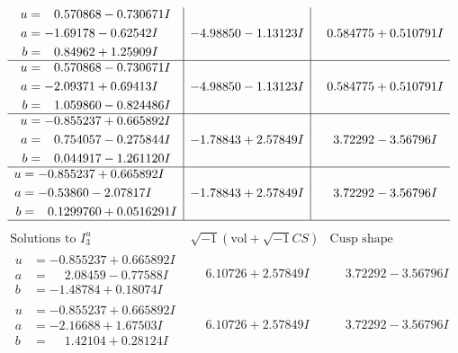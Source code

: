 \documentclass[1p]{elsarticle_modified}
\theoremstyle{definition}
\newcommand{\I}{\sqrt{-1}}
\begin{document}
$$\begin{array}{c|c|c}
\begin{aligned}
u &= \phantom{-}0.570868 - 0.730671 I \\
a &= -1.69178 - 0.62542 I \\
b &= \phantom{-}0.84962 + 1.25909 I\end{aligned}
 & -4.98850 - 1.13123 I & \phantom{-}0.584775 + 0.510791 I \\ \hline\begin{aligned}
u &= \phantom{-}0.570868 - 0.730671 I \\
a &= -2.09371 + 0.69413 I \\
b &= \phantom{-}1.059860 - 0.824486 I\end{aligned}
 & -4.98850 - 1.13123 I & \phantom{-}0.584775 + 0.510791 I \\ \hline\begin{aligned}
u &= -0.855237 + 0.665892 I \\
a &= \phantom{-}0.754057 - 0.275844 I \\
b &= \phantom{-}0.044917 - 1.261120 I\end{aligned}
 & -1.78843 + 2.57849 I & \phantom{-}3.72292 - 3.56796 I \\ \hline\begin{aligned}
u &= -0.855237 + 0.665892 I \\
a &= -0.53860 - 2.07817 I \\
b &= \phantom{-}0.1299760 + 0.0516291 I\end{aligned}
 & -1.78843 + 2.57849 I & \phantom{-}3.72292 - 3.56796 I\\
 \hline 
 \end{array}$$\newpage$$\begin{array}{c|c|c}  
\text{Solutions to }I^u_{3}& \I (\text{vol} + \sqrt{-1}CS) & \text{Cusp shape}\\
 \hline 
\begin{aligned}
u &= -0.855237 + 0.665892 I \\
a &= \phantom{-}2.08459 - 0.77588 I \\
b &= -1.48784 + 0.18074 I\end{aligned}
 & \phantom{-}6.10726 + 2.57849 I & \phantom{-}3.72292 - 3.56796 I \\ \hline\begin{aligned}
u &= -0.855237 + 0.665892 I \\
a &= -2.16688 + 1.67503 I \\
b &= \phantom{-}1.42104 + 0.28124 I\end{aligned}
 & \phantom{-}6.10726 + 2.57849 I & \phantom{-}3.72292 - 3.56796 I \\ \hline\begin{aligned}

\end{aligned}
\end{array}$$
\end{document}
